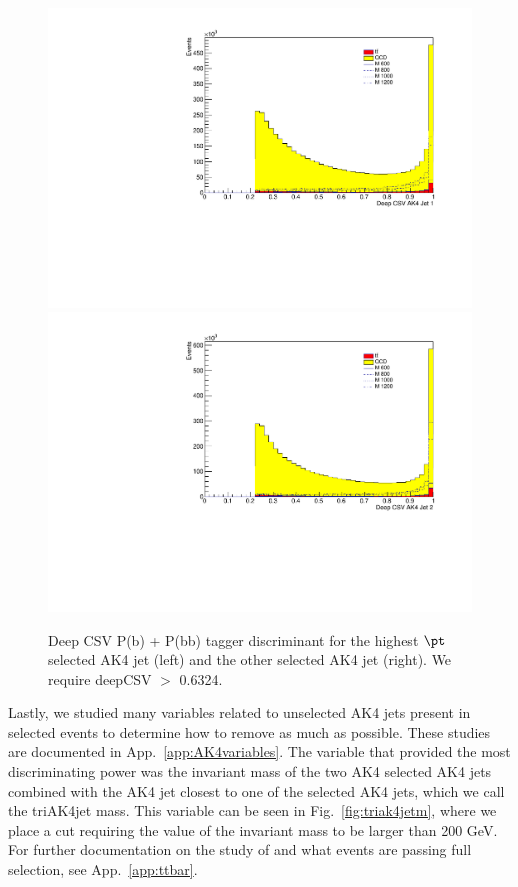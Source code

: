 \begin{figure}[h]
\begin{center}
\includegraphics[scale=0.34]{F5/shapebtag1.pdf}
\includegraphics[scale=0.34]{F5/shapebtag2.pdf}
\end{center}
\caption{Deep CSV P(b) + P(bb) tagger discriminant for the highest $\pt$ selected AK4 jet (left) and the other selected AK4 jet (right). We require deepCSV $>$ 0.6324.}
\label{fig:AK4btag}
\end{figure} 


Lastly, we studied many variables related to unselected AK4 jets present in selected events to determine how to remove as much \ttbar as possible. These studies are documented in App.~\ref{app:AK4variables}. The variable that provided the most discriminating power was the invariant mass of the two AK4 selected AK4 jets combined with the AK4 jet closest to one of the selected AK4 jets, which we call the triAK4jet mass. This variable can be seen in Fig.~\ref{fig:triak4jetm}, where we place a cut requiring the value of the invariant mass to be larger than 200 GeV. For further documentation on the study of \ttbar and what events are passing full selection, see App.~\ref{app:ttbar}.

